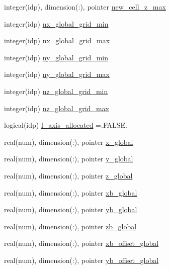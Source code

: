 \begin{DoxyCompactItemize}
\item 
integer(idp), dimension(\+:), pointer \hyperlink{namespaceshared__data_af651b235568738333e3da34d9bf45e3e}{new\+\_\+cell\+\_\+z\+\_\+max}
\item 
integer(idp) \hyperlink{namespaceshared__data_ac7d2abcd22e1c66dd8219334bfd59d32}{nx\+\_\+global\+\_\+grid\+\_\+min}
\item 
integer(idp) \hyperlink{namespaceshared__data_a038972078d665e998a4c47bb38b27170}{nx\+\_\+global\+\_\+grid\+\_\+max}
\item 
integer(idp) \hyperlink{namespaceshared__data_af8ebf934517535333be7a1c20d2acdac}{ny\+\_\+global\+\_\+grid\+\_\+min}
\item 
integer(idp) \hyperlink{namespaceshared__data_ae3340a961cc80b190f3f94eca4f70720}{ny\+\_\+global\+\_\+grid\+\_\+max}
\item 
integer(idp) \hyperlink{namespaceshared__data_a4d4e8b153ff11b729a93959b3cbb94ab}{nz\+\_\+global\+\_\+grid\+\_\+min}
\item 
integer(idp) \hyperlink{namespaceshared__data_ad91a511266f2d05cfcdff8f7dc585e52}{nz\+\_\+global\+\_\+grid\+\_\+max}
\item 
logical(idp) \hyperlink{namespaceshared__data_a535396756120187a82019bbf9bcb2563}{l\+\_\+axis\+\_\+allocated} =.F\+A\+L\+S\+E.
\item 
real(num), dimension(\+:), pointer \hyperlink{namespaceshared__data_a103bc2f0564094768f3a34476b371d3a}{x\+\_\+global}
\item 
real(num), dimension(\+:), pointer \hyperlink{namespaceshared__data_a983366c15907d7a58fe04de8a618aa7f}{y\+\_\+global}
\item 
real(num), dimension(\+:), pointer \hyperlink{namespaceshared__data_a560ccdd90913c790de3698e6caa6ed8b}{z\+\_\+global}
\item 
real(num), dimension(\+:), pointer \hyperlink{namespaceshared__data_a22e4d784058444556c04be431d584ec7}{xb\+\_\+global}
\item 
real(num), dimension(\+:), pointer \hyperlink{namespaceshared__data_a5c47105c9e91eee415dcf5d99f2feffc}{yb\+\_\+global}
\item 
real(num), dimension(\+:), pointer \hyperlink{namespaceshared__data_afd2142e5ba5165c1826ad1826cb061e3}{zb\+\_\+global}
\item 
real(num), dimension(\+:), pointer \hyperlink{namespaceshared__data_a5fe1885535a9b60b53e19525797f551a}{xb\+\_\+offset\+\_\+global}
\item 
real(num), dimension(\+:), pointer \hyperlink{namespaceshared__data_a73076ccf0db0fc2938cfb670ead8e284}{yb\+\_\+offset\+\_\+global}

\end{DoxyCompactItemize}
